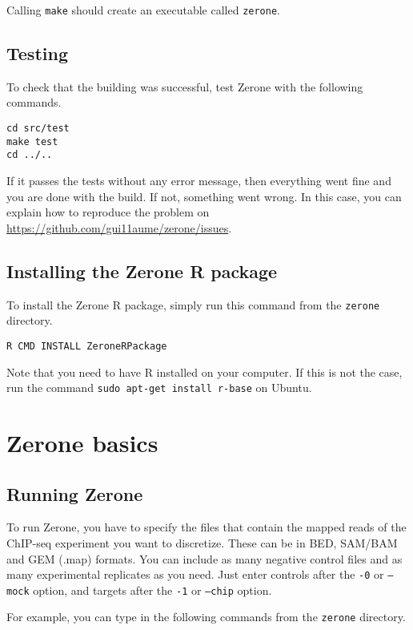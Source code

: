 \documentclass[12pt]{article}
\begin{document}
Calling \texttt{make} should create an executable called \texttt{zerone}.

\subsection{Testing}

To check that the building was successful, test Zerone with
the following commands.

\begin{verbatim}
cd src/test
make test
cd ../..
\end{verbatim}

If it passes the tests without any error message, then everything went fine
and you are done with the build. If not, something went
wrong. In this case, you can explain how to reproduce the problem
on \url{https://github.com/gui11aume/zerone/issues}.

\subsection*{Installing the Zerone R package}

To install the Zerone R package, simply run this command from the
\texttt{zerone} directory.

\begin{verbatim}
R CMD INSTALL ZeroneRPackage
\end{verbatim}

Note that you need to have R installed on your computer. If this is not the
case, run the command \texttt{sudo apt-get install r-base} on Ubuntu.

\section{Zerone basics}

\subsection{Running Zerone}

To run Zerone, you have to specify the files that contain the mapped reads
of the ChIP-seq experiment you want to discretize. These can be in BED,
SAM/BAM and GEM (.map) formats. You can include as many negative control
files and as many experimental replicates as you need. Just enter controls
after the \texttt{-0} or \texttt{--mock} option, and targets
after the \texttt{-1} or \texttt{--chip} option.

For example, you can type in the following commands from the \texttt{zerone}
directory.
\end{document}

